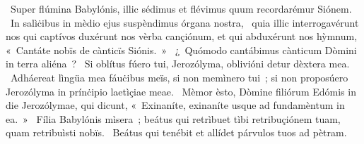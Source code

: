 ~Super flúmina Babylónis, illic sédimus et flévimus quum recordarémur Siónem. 
~In salìċibus in mèdio ejus suspèndimus órgana nostra, 
~quia illic interrogavérunt nos qui captívos duxérunt nos vèrba cançiónum, et qui abduxérunt nos hỳmnum, «~Cantáte nobïs de cànticïs Siónis.~»
~¿~Quómodo cantábimus cànticum Dòmini in terra aliéna~? 
~Si oblítus fúero tui, Jerozólyma, oblivióni detur dèxtera mea. 
~Adháereat lìngüa mea fáuċibus meïs, si non memìnero tui~; si non proposúero Jerozólyma in prínċipio laetìçiae meae. 
~Mèmor èsto, Dòmine filiórum Edómis in die Jerozólymae, qui dicunt, «~Exinaníte, exinaníte usque ad fundamèntum in ea.~»
~Fília Babylónis mìsera~; beátus qui retrìbuet tìbi retribuçiónem tuam, quam retribuìsti nobïs. 
~Beátus qui tenébit et allídet párvulos tuos ad pètram. 
